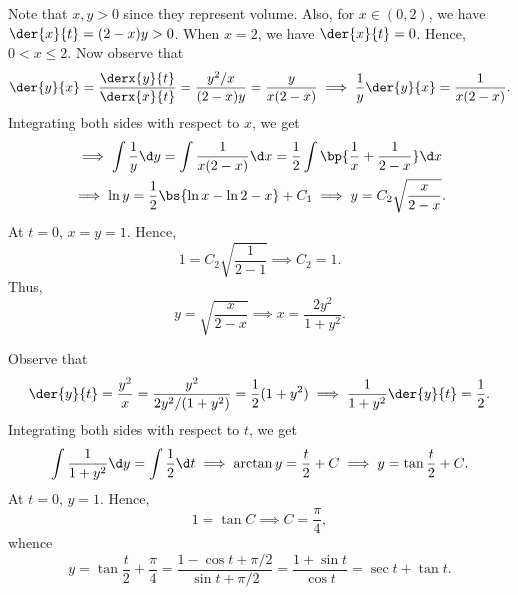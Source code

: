 \begin{solution}
    \begin{ppart}
        Note that $x, y > 0$ since they represent volume. Also, for $x \in (0, 2)$, we have $\der{x}{t} = (2-x)y > 0$. When $x = 2$, we have $\der{x}{t} = 0$. Hence, $0 < x \leq 2$. Now observe that \[\der{y}{x} = \frac{\derx{y}{t}}{\derx{x}{t}} = \frac{y^2/x}{(2-x)y} = \frac{y}{x(2-x)} \implies \frac1y \der{y}{x} = \frac1{x(2-x)}.\] Integrating both sides with respect to $x$, we get
        \begin{gather*}
            \implies \int \frac1y \d y = \int \frac1{x(2-x)} \d x = \frac12 \int \bp{\frac1x + \frac1{2-x}} \d x\\
            \implies \ln y = \frac12 \bs{\ln x - \ln
            {2-x}} + C_1 \implies y = C_2 \sqrt{\frac{x}{2-x}}.
        \end{gather*}
        At $t = 0$, $x = y = 1$. Hence, \[1 = C_2 \sqrt{\frac{1}{2-1}} \implies C_2 = 1.\] Thus, \[y = \sqrt{\frac{x}{2-x}} \implies x = \frac{2y^2}{1 + y^2}.\]
    \end{ppart}
    \begin{ppart}
        Observe that \[\der{y}{t} = \frac{y^2}{x} = \frac{y^2}{2y^2/(1+y^2)} = \frac12 (1 + y^2) \implies \frac1{1+y^2} \der{y}{t} = \frac12.\] Integrating both sides with respect to $t$, we get \[\int \frac1{1+y^2} \d y = \int \frac12 \d t \implies \arctan y = \frac{t}2 + C \implies y = \tan{\frac{t}2 + C}.\] At $t = 0$, $y = 1$. Hence, \[1 = \tan C \implies C = \frac\pi4,\] whence \[y = \tan{\frac{t}2 + \frac\pi4} = \frac{1-\cos{t + \pi/2}}{\sin{t+\pi/2}} = \frac{1 + \sin t}{\cos t} = \sec t + \tan t.\]


\end{ppart}
\end{solution}
